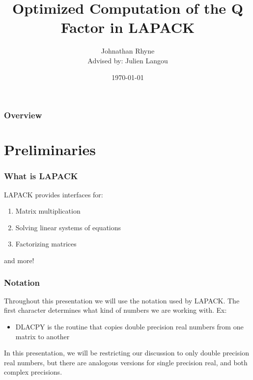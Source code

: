 \documentclass[12pt]{beamer}
\title{Optimized Computation of the Q Factor in LAPACK}
\author{Johnathan Rhyne\\Advised by: Julien Langou}
\institute{University of Colorado Denver}
\date{\today}
\begin{document}
    \begin{frame}
        \titlepage
    \end{frame}
    \begin{framefont}{\small}
    \begin{frame}
        \frametitle{Overview}
        \begin{multicols}{2}
            \tableofcontents
        \end{multicols}
    \end{frame}
    \end{framefont}
    \section{Preliminaries}
    \begin{frame}
        \frametitle{What is LAPACK}
        LAPACK provides interfaces for:
        \begin{enumerate}
            \item Matrix multiplication
            \item Solving linear systems of equations
            \item Factorizing matrices
        \end{enumerate}
        and more!
    \end{frame}
    \begin{frame}
        \frametitle{Notation}
        Throughout this presentation we will use the notation used by LAPACK. The first character determines what kind of numbers we are working with. Ex:
        \begin{itemize}
            \item DLACPY is the routine that copies double precision real numbers from one matrix to another
        \end{itemize}
        In this presentation, we will be restricting our discussion to only double precision real numbers,
        but there are analogous versions for single precision real, and both complex precisions.
    \end{frame}
\end{document}

